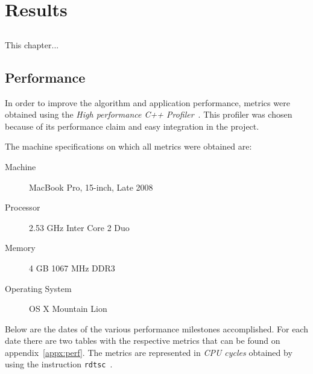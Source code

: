 \chapter{Results} \label{chap:results}

\section*{}


This chapter... %

\section{Performance} \label{sec:results:perf}

In order to improve the algorithm and application performance, metrics were
obtained using the \emph{High performance C++ Profiler}~\cite{Andrew2013High}.
This profiler was chosen because of its performance claim and easy integration
in the project.

The machine specifications on which all metrics were obtained are:

\begin{description}
  \item[Machine] MacBook Pro, 15-inch, Late 2008
  \item[Processor] 2.53 GHz Inter Core 2 Duo
  \item[Memory] 4 GB 1067 MHz DDR3
  \item[Operating System] OS X Mountain Lion
\end{description}

Below are the dates of the various performance milestones accomplished.
For each date there are two tables with the respective metrics that can be found
on appendix~\ref{appx:perf}. The metrics are represented in \emph{CPU cycles}
obtained by using the instruction \texttt{rdtsc}~\cite{Andrew2013High}.


